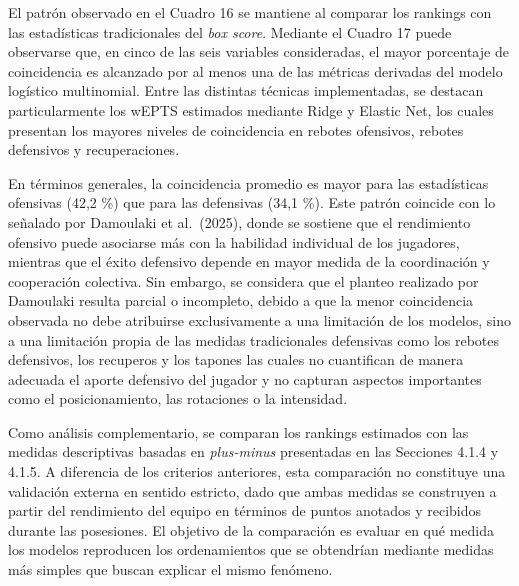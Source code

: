 \documentclass[
  12pt,
]{article}
\begin{document}
El patrón observado en el Cuadro 16 se mantiene al comparar los rankings
con las estadísticas tradicionales del \emph{box score}. Mediante el
Cuadro 17 puede observarse que, en cinco de las seis variables
consideradas, el mayor porcentaje de coincidencia es alcanzado por al
menos una de las métricas derivadas del modelo logístico multinomial.
Entre las distintas técnicas implementadas, se destacan particularmente
los wEPTS estimados mediante Ridge y Elastic Net, los cuales presentan
los mayores niveles de coincidencia en rebotes ofensivos, rebotes
defensivos y recuperaciones.

En términos generales, la coincidencia promedio es mayor para las
estadísticas ofensivas (42,2 \%) que para las defensivas (34,1 \%). Este
patrón coincide con lo señalado por Damoulaki et al.~(2025), donde se
sostiene que el rendimiento ofensivo puede asociarse más con la
habilidad individual de los jugadores, mientras que el éxito defensivo
depende en mayor medida de la coordinación y cooperación colectiva. Sin
embargo, se considera que el planteo realizado por Damoulaki resulta
parcial o incompleto, debido a que la menor coincidencia observada no
debe atribuirse exclusivamente a una limitación de los modelos, sino a
una limitación propia de las medidas tradicionales defensivas como los
rebotes defensivos, los recuperos y los tapones las cuales no
cuantifican de manera adecuada el aporte defensivo del jugador y no
capturan aspectos importantes como el posicionamiento, las rotaciones o
la intensidad.

Como análisis complementario, se comparan los rankings estimados con las
medidas descriptivas basadas en \emph{plus-minus} presentadas en las
Secciones 4.1.4 y 4.1.5. A diferencia de los criterios anteriores, esta
comparación no constituye una validación externa en sentido estricto,
dado que ambas medidas se construyen a partir del rendimiento del equipo
en términos de puntos anotados y recibidos durante las posesiones. El
objetivo de la comparación es evaluar en qué medida los modelos
reproducen los ordenamientos que se obtendrían mediante medidas más
simples que buscan explicar el mismo fenómeno.
\end{document}
